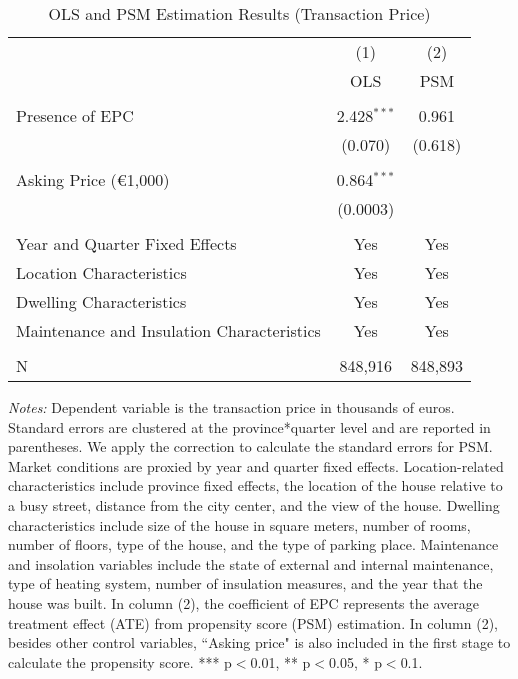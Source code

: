 \documentclass[12pt]{article}
\begin{document}
\clearpage
\newpage
\begin{table}[H]
\footnotesize
  \centering
  \caption{OLS and PSM Estimation Results (Transaction Price)}
      \begin{tabular}{lcc}
\hline
                &\multicolumn{1}{c}{(1)}&\multicolumn{1}{c}{(2)}\\
&                  OLS& PSM \\
\hline
&&\\
 Presence of EPC	 &  2.428$^{***}$ & 0.961 \\
& (0.070) & (0.618)  \\
&&\\
Asking Price (\euro 1,000)	&	 0.864$^{***}$ & 	 \\
&   (0.0003) &  \\
&&\\
Year and Quarter Fixed Effects  & Yes & Yes \\
Location Characteristics & Yes & Yes \\
Dwelling Characteristics  & Yes & Yes \\
Maintenance and Insulation Characteristics & Yes & Yes \\
&&\\
N	& 848,916 &	848,893 \\
\hline

    \end{tabular}%
\begin{tablenotes}
\scriptsize
\item \textit{Notes:} Dependent variable is the transaction price in thousands of euros. Standard errors are clustered at the province*quarter level and are reported in parentheses. We apply the \citep{abadie2016matching} correction to calculate the standard errors for PSM. Market conditions are proxied by year and quarter fixed effects. Location-related characteristics include province fixed effects, the location of the house relative to a busy street, distance from the city center, and the view of the house. Dwelling characteristics include size of the house in square meters, number of rooms, number of floors, type of the house, and the type of parking place. Maintenance and insolation variables include the state of external and internal maintenance, type of heating system, number of insulation measures, and the year that the house was built. In column (2), the coefficient of EPC represents the average treatment effect (ATE) from propensity score (PSM) estimation. In column (2), besides other control variables, ``Asking price" is also included in the first stage to calculate the propensity score.   *** p$<$0.01, ** p$<$0.05, * p$<$0.1. 
\end{tablenotes}

  \label{tab:addlabel}%
\end{table}%
\end{document}
